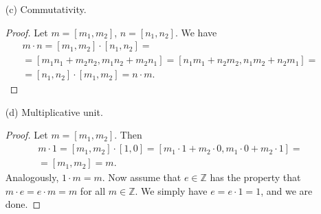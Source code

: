 \begin{problem}
\begin{enumerate}
        \item[(c)] Commutativity.
            \begin{proof}
                Let $m = [m_1, m_2]$, $n = [n_1, n_2]$. We have
                \begin{gather*}
                    m \cdot n = [m_1,m_2] \cdot [n_1,n_2] =\\=
                    [m_1n_1 + m_2n_2, m_1n_2 + m_2n_1] = [n_1m_1 + n_2m_2, n_1m_2 + n_2m_1] =\\=
                    [n_1,n_2] \cdot [m_1,m_2] = n \cdot m.
                \end{gather*}
            \end{proof}

        \item[(d)] Multiplicative unit.
            \begin{proof}
                Let $m = [m_1, m_2]$. Then
                \begin{gather*}
                    m \cdot 1 = [m_1,m_2] \cdot [1,0] = [m_1 \cdot 1 + m_2 \cdot 0, m_1 \cdot 0 + m_2 \cdot 1] =\\=
                    [m_1, m_2] = m.
                \end{gather*}
                Analogously, $1 \cdot m = m$. Now assume that $e \in \mathbb{Z}$ has the property that $m \cdot e = e \cdot m = m$ for all $m \in \mathbb{Z}$. We simply have $e = e \cdot 1 = 1$, and we are done.
            \end{proof}


\end{enumerate}
\end{problem}
